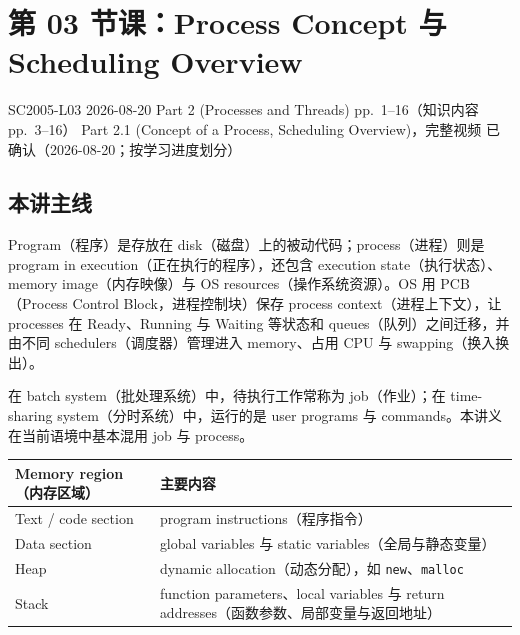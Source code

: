 
\section{第 03 节课：Process Concept 与 Scheduling Overview}
\label{lecture:SC2005-L03}

\lecturemeta
  {SC2005-L03}
  {2026-08-20}
  {Part 2 (Processes and Threads)}
  {pp.~1--16（知识内容 pp.~3--16）}
  {Part 2.1 (Concept of a Process, Scheduling Overview)，完整视频}
  {已确认（2026-08-20；按学习进度划分）}

\subsection{本讲主线}

Program（程序）是存放在 disk（磁盘）上的被动代码；process（进程）则是 program in execution（正在执行的程序），还包含 execution state（执行状态）、memory image（内存映像）与 OS resources（操作系统资源）。OS 用 PCB（Process Control Block，进程控制块）保存 process context（进程上下文），让 processes 在 Ready、Running 与 Waiting 等状态和 queues（队列）之间迁移，并由不同 schedulers（调度器）管理进入 memory、占用 CPU 与 swapping（换入换出）。



在 batch system（批处理系统）中，待执行工作常称为 job（作业）；在 time-sharing system（分时系统）中，运行的是 user programs 与 commands。本讲义在当前语境中基本混用 job 与 process。

\begin{center}
\small
\begin{tabularx}{0.94\textwidth}{@{}>{\raggedright\arraybackslash}p{3.0cm}X@{}}
  \toprule
  Memory region（内存区域） & 主要内容 \\
  \midrule
  Text / code section & program instructions（程序指令） \\
  Data section & global variables 与 static variables（全局与静态变量） \\
  Heap & dynamic allocation（动态分配），如 \texttt{new}、\texttt{malloc} \\
  Stack & function parameters、local variables 与 return addresses（函数参数、局部变量与返回地址） \\
  \bottomrule
\end{tabularx}
\end{center}

